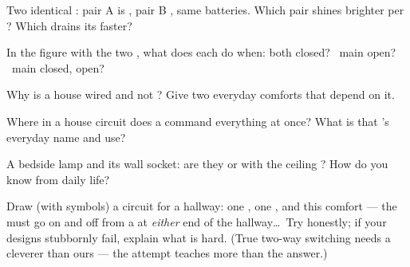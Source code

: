 \begin{exercise}[$\star$]\label{exo:g5:series-parallel-circuits:4}
Two identical : pair A is , pair B , same
batteries. Which pair shines brighter per ? Which drains its
 faster?
\end{exercise}

\begin{exercise}[$\star$]\label{exo:g5:series-parallel-circuits:5}
In the figure with the two , what does each  do when:
both  closed? \ main open? \ main closed,  
open?
\end{exercise}

\begin{exercise}[$\star$]\label{exo:g5:series-parallel-circuits:6}
Why is a house wired  and not ? Give two
everyday comforts that depend on it.
\end{exercise}

\begin{exercise}[$\star$]\label{exo:g5:series-parallel-circuits:7}
Where in a house circuit does a  command everything at once?
What is that 's everyday name and use?
\end{exercise}

\begin{exercise}[$\star$]\label{exo:g5:series-parallel-circuits:8}
A bedside lamp and its wall socket: are they  or  with the ceiling ? How do you know from daily life?
\end{exercise}

\begin{exercise}[$\star\star$]\label{exo:g5:series-parallel-circuits:9}
Draw (with symbols) a circuit for a hallway: one , one ,
and this comfort --- the  must go on and off from a  at
\emph{either} end of the hallway\dots\ Try honestly; if your
designs stubbornly fail, explain what is hard. (True two-way
switching needs a cleverer  than ours --- the attempt teaches
more than the answer.)
\end{exercise}

